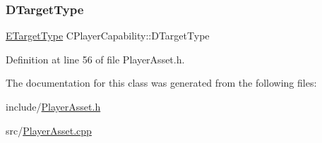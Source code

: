 \hypertarget{classCPlayerCapability_af3e2c3d386fbdce314d36e3e16ee823c}{}\label{classCPlayerCapability_af3e2c3d386fbdce314d36e3e16ee823c} 
\subsubsection{\texorpdfstring{D\+Target\+Type}{DTargetType}}
{\footnotesize\ttfamily \hyperlink{classCPlayerCapability_a9d3450ed1532fd536bd6cbb1e2eef02f}{E\+Target\+Type} C\+Player\+Capability\+::\+D\+Target\+Type\hspace{0.3cm}{\ttfamily [protected]}}



Definition at line 56 of file Player\+Asset.\+h.



The documentation for this class was generated from the following files\+:\begin{DoxyCompactItemize}
\item 
include/\hyperlink{PlayerAsset_8h}{Player\+Asset.\+h}\item 
src/\hyperlink{PlayerAsset_8cpp}{Player\+Asset.\+cpp}\end{DoxyCompactItemize}
